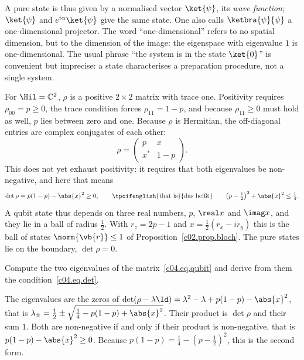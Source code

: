 A pure state is thus given by a normalised vector $\ket{\psi}$, its \emph{wave function};
$\ket{\psi}$ and $e^{i\alpha}\ket{\psi}$ give the same state. One also calls $\ketbra{\psi}{\psi}$
a one-dimensional projector. The word ``one-dimensional'' refers to no spatial dimension, but to
the dimension of the image: the eigenspace with eigenvalue $1$ is one-dimensional. The usual
phrase ``the system is in the state $\ket{0}$'' is convenient but imprecise: a state characterises
a preparation procedure, not a single system.

\begin{example}\label{c04.ex.qubit-zustaende}
  For $\Hil = \mathbb{C}^2$, $\rho$ is a positive $2\times 2$ matrix with trace one. Positivity
  requires $\rho_{00} = p \geq 0$, the trace condition forces $\rho_{11} = 1-p$, and because
  $\rho_{11}\geq 0$ must hold as well, $p$ lies between zero and one. Because $\rho$ is Hermitian,
  the off-diagonal entries are complex conjugates of each other:
  \begin{equation}\label{c04.eq.qubit}
    \rho = \begin{pmatrix} p & x \\ x^* & 1-p \end{pmatrix} .
  \end{equation}
  This does not yet exhaust positivity: it requires that both eigenvalues be non-negative, and
  here that means
  \begin{equation}\label{c04.eq.det}
    \det\rho = p(1-p) - \abs{x}^2 \geq 0 ,
    \qquad \text{\tpcifenglish{that is}{das heißt}} \qquad
    \bigl(p - \tfrac12\bigr)^2 + \abs{x}^2 \leq \tfrac14 .
  \end{equation}
  A qubit state thus depends on three real numbers, $p$, $\real x$ and $\imag x$, and they lie in
  a ball of radius $\tfrac12$. With $r_z = 2p - 1$ and $x = \tfrac12(r_x - i r_y)$ this is the
  ball of states $\norm{\vb{r}} \leq 1$ of Proposition~\ref{c02.prop.bloch}. The pure states lie
  on the boundary, $\det\rho = 0$.
\end{example}

\begin{exercise}\label{c04.exc.eigenwerte}
  Compute the two eigenvalues of the matrix~\eqref{c04.eq.qubit} and derive from them the
  condition~\eqref{c04.eq.det}.
\end{exercise}
\begin{solution}
  The eigenvalues are the zeros of
  $\det(\rho - \lambda\Id) = \lambda^2 - \lambda + p(1-p) - \abs{x}^2$, that is
  $\lambda_\pm = \tfrac12 \pm \sqrt{\tfrac14 - p(1-p) + \abs{x}^2}$. Their product is $\det\rho$
  and their sum $1$. Both are non-negative if and only if their product is non-negative, that is
  $p(1-p) - \abs{x}^2 \geq 0$. Because $p(1-p) = \tfrac14 - (p - \tfrac12)^2$, this is the second
  form.
\end{solution}

